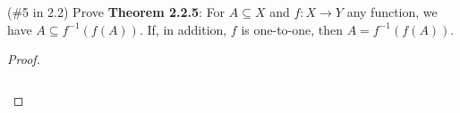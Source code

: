 (\#5 in 2.2) Prove \textbf{Theorem 2.2.5}: For $A\subseteq X$ and
$f:X\to Y$ any function, we have $A\subseteq f^{-1}(f(A))$. If, in addition, 
$f$ is one-to-one, then $A=f^{-1}(f(A))$.

    \begin{proof}\renewcommand{\qedsymbol}{}\ \\\\
        \begin{align*}
        \end{align*}
    \end{proof}